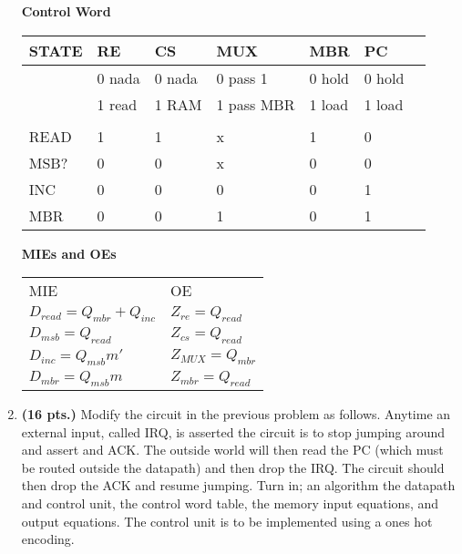\begin{enumerate}
\begin{onlysolution}
{                \textbf{ Control Word}

                \begin{tabular}{l|l|l|l|l|l|l}
                    STATE & RE     & CS     &MUX          &MBR    & PC    \\ \hline
                    & 0 nada & 0 nada &0 pass 1     &0 hold &0 hold    \\ \hline
                    & 1 read & 1 RAM  &1 pass MBR   &1 load &1 load    \\ \hline
                    &        &        &             &       &           \\ \hline
                    READ  & 1      & 1      & x           & 1     & 0    \\ \hline
                    MSB?  & 0      & 0      & x           & 0     & 0    \\ \hline
                    INC   & 0      & 0      & 0           & 0     & 1    \\ \hline
                    MBR   & 0      & 0      & 1           & 0     & 1    \\ \hline
                \end{tabular}

                \textbf{ MIEs and OEs}

                \begin{tabular}{ll}
                    MIE                    &    OE            \\
                    $D_{read}= Q_{mbr}+Q_{inc}$        &  $Z_{re} = Q_{read}$        \\
                    $D_{msb} = Q_{read}$            &  $Z_{cs} = Q_{read}$        \\
                    $D_{inc}= Q_{msb} m'$            &  $Z_{MUX} = Q_{mbr}$        \\
                    $D_{mbr}= Q_{msb} m$            &  $Z_{mbr} = Q_{read}$        \\
                \end{tabular}

            }
        \end{onlysolution}

    \item \textbf{ (16 pts.)}
        Modify the circuit in the previous problem as follows.  Anytime
        an external input, called IRQ, is asserted the circuit is to stop
        jumping around and assert and ACK.  The outside world will then read
        the PC (which must be routed outside the datapath) and then drop the
        IRQ.  The circuit should then drop the ACK and resume jumping.
        Turn in; an algorithm the datapath and control unit, the control word
        table, the memory input equations, and output equations.
        The control unit is to be implemented using a ones hot encoding.


\end{enumerate}
